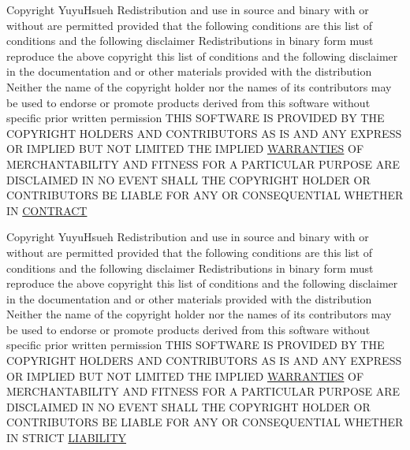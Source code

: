 \begin{DoxyCompactItemize}
\item 
Copyright Yuyu\+Hsueh Redistribution and use in source and binary with or without are permitted provided that the following conditions are this list of conditions and the following disclaimer Redistributions in binary form must reproduce the above copyright this list of conditions and the following disclaimer in the documentation and or other materials provided with the distribution Neither the name of the copyright holder nor the names of its contributors may be used to endorse or promote products derived from this software without specific prior written permission T\+H\+IS S\+O\+F\+T\+W\+A\+RE IS P\+R\+O\+V\+I\+D\+ED BY T\+HE C\+O\+P\+Y\+R\+I\+G\+HT H\+O\+L\+D\+E\+RS A\+ND C\+O\+N\+T\+R\+I\+B\+U\+T\+O\+RS AS IS A\+ND A\+NY E\+X\+P\+R\+E\+SS OR I\+M\+P\+L\+I\+ED B\+UT N\+OT L\+I\+M\+I\+T\+ED T\+HE I\+M\+P\+L\+I\+ED \hyperlink{license_8txt_a042eb66328050ad88743187ae8e43b95}{W\+A\+R\+R\+A\+N\+T\+I\+ES} OF M\+E\+R\+C\+H\+A\+N\+T\+A\+B\+I\+L\+I\+TY A\+ND F\+I\+T\+N\+E\+SS F\+OR A P\+A\+R\+T\+I\+C\+U\+L\+AR P\+U\+R\+P\+O\+SE A\+RE D\+I\+S\+C\+L\+A\+I\+M\+ED IN NO E\+V\+E\+NT S\+H\+A\+LL T\+HE C\+O\+P\+Y\+R\+I\+G\+HT H\+O\+L\+D\+ER OR C\+O\+N\+T\+R\+I\+B\+U\+T\+O\+RS BE L\+I\+A\+B\+LE F\+OR A\+NY OR C\+O\+N\+S\+E\+Q\+U\+E\+N\+T\+I\+AL W\+H\+E\+T\+H\+ER IN \hyperlink{license_8txt_ad1b3910f726d03f8987a2ad1665d309c}{C\+O\+N\+T\+R\+A\+CT}
\item 
Copyright Yuyu\+Hsueh Redistribution and use in source and binary with or without are permitted provided that the following conditions are this list of conditions and the following disclaimer Redistributions in binary form must reproduce the above copyright this list of conditions and the following disclaimer in the documentation and or other materials provided with the distribution Neither the name of the copyright holder nor the names of its contributors may be used to endorse or promote products derived from this software without specific prior written permission T\+H\+IS S\+O\+F\+T\+W\+A\+RE IS P\+R\+O\+V\+I\+D\+ED BY T\+HE C\+O\+P\+Y\+R\+I\+G\+HT H\+O\+L\+D\+E\+RS A\+ND C\+O\+N\+T\+R\+I\+B\+U\+T\+O\+RS AS IS A\+ND A\+NY E\+X\+P\+R\+E\+SS OR I\+M\+P\+L\+I\+ED B\+UT N\+OT L\+I\+M\+I\+T\+ED T\+HE I\+M\+P\+L\+I\+ED \hyperlink{license_8txt_a042eb66328050ad88743187ae8e43b95}{W\+A\+R\+R\+A\+N\+T\+I\+ES} OF M\+E\+R\+C\+H\+A\+N\+T\+A\+B\+I\+L\+I\+TY A\+ND F\+I\+T\+N\+E\+SS F\+OR A P\+A\+R\+T\+I\+C\+U\+L\+AR P\+U\+R\+P\+O\+SE A\+RE D\+I\+S\+C\+L\+A\+I\+M\+ED IN NO E\+V\+E\+NT S\+H\+A\+LL T\+HE C\+O\+P\+Y\+R\+I\+G\+HT H\+O\+L\+D\+ER OR C\+O\+N\+T\+R\+I\+B\+U\+T\+O\+RS BE L\+I\+A\+B\+LE F\+OR A\+NY OR C\+O\+N\+S\+E\+Q\+U\+E\+N\+T\+I\+AL W\+H\+E\+T\+H\+ER IN S\+T\+R\+I\+CT \hyperlink{license_8txt_a293cddb201641aed1186322968630e55}{L\+I\+A\+B\+I\+L\+I\+TY}
\end{DoxyCompactItemize}



